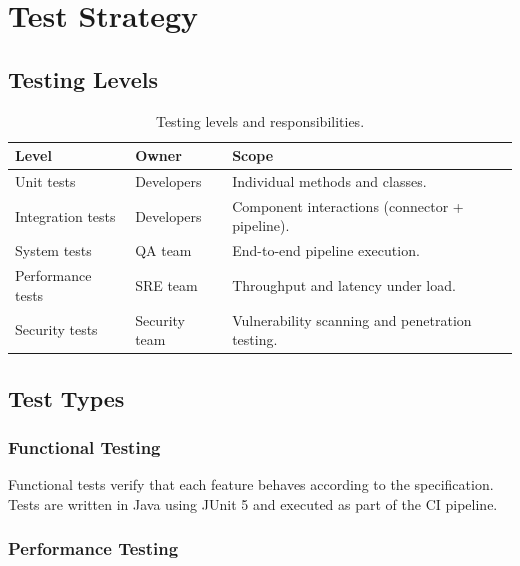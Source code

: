 \documentclass[
    language=english,
    doctype=technical-report,
    institution=none,
    titlestyle=book,
    oneside,
]{../../omnilatex}
\begin{document}
\chapter{Test Strategy}
\label{sec:strategy}

\section{Testing Levels}

\begin{table}[htbp]
    \centering
    \caption{Testing levels and responsibilities.}
    \label{tab:test-levels}
    \begin{tabular}{@{}llp{5cm}@{}}
        \toprule
        Level & Owner & Scope \\
        \midrule
        Unit tests & Developers & Individual methods and classes. \\
        Integration tests & Developers & Component interactions
            (connector + pipeline). \\
        System tests & QA team & End-to-end pipeline execution. \\
        Performance tests & SRE team & Throughput and latency under load. \\
        Security tests & Security team & Vulnerability scanning and
            penetration testing. \\
        \bottomrule
    \end{tabular}
\end{table}

\section{Test Types}

\subsection{Functional Testing}

Functional tests verify that each feature behaves according to the
specification. Tests are written in Java using JUnit 5 and executed as
part of the CI pipeline.

\subsection{Performance Testing}
\end{document}

